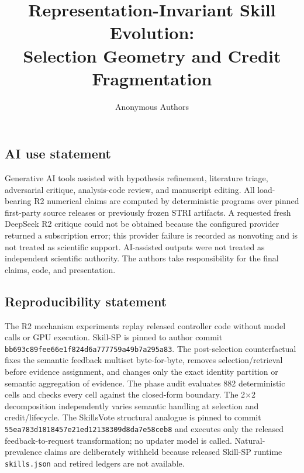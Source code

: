 \documentclass{article}
\title{Representation-Invariant Skill Evolution:\\Selection Geometry and Credit Fragmentation}
\author{Anonymous Authors}
\begin{document}
\maketitle


\clearpage
\label{stri-r2:post-main-page}

\subsection*{AI use statement}
Generative AI tools assisted with hypothesis refinement, literature triage, adversarial critique, analysis-code review, and manuscript editing. All load-bearing R2 numerical claims are computed by deterministic programs over pinned first-party source releases or previously frozen STRI artifacts. A requested fresh DeepSeek R2 critique could not be obtained because the configured provider returned a subscription error; this provider failure is recorded as nonvoting and is not treated as scientific support. AI-assisted outputs were not treated as independent scientific authority. The authors take responsibility for the final claims, code, and presentation.

\subsection*{Reproducibility statement}
The R2 mechanism experiments replay released controller code without model calls or GPU execution. Skill-SP is pinned to author commit \texttt{bb693c89fee66e1f824d6a777759a49b7a295a83}. The post-selection counterfactual fixes the semantic feedback multiset byte-for-byte, removes selection/retrieval before evidence assignment, and changes only the exact identity partition or semantic aggregation of evidence. The phase audit evaluates 882 deterministic cells and checks every cell against the closed-form boundary. The 2$\times$2 decomposition independently varies semantic handling at selection and credit/lifecycle. The SkillsVote structural analogue is pinned to commit \texttt{55ea783d1818457e21ed12138309d8da7e58ceb8} and executes only the released feedback-to-request transformation; no updater model is called. Natural-prevalence claims are deliberately withheld because released Skill-SP runtime \texttt{skills.json} and retired ledgers are not available.



\end{document}
